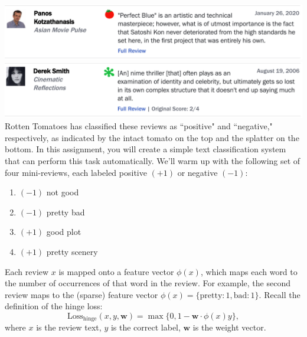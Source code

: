 \documentclass{article}
\theoremstyle{case}
\theoremstyle{definition}
\begin{document}
\includegraphics[width=\textwidth]{images/posreview.png}
\includegraphics[width=\textwidth]{images/negreview.png}
Rotten Tomatoes has classified these reviews as ``positive" and ``negative,"
     respectively, as indicated by the intact tomato on the top  and the
     splatter on the bottom. In this assignment, you will create a simple
     text classification system that can perform this task automatically. We'll warm up with the following set of four mini-reviews, each labeled
     positive $(+1)$ or negative $(-1)$:
\begin{enumerate}
    \item $(-1)$ not good
    \item $(-1)$ pretty bad
    \item $(+1)$ good plot
    \item $(+1)$ pretty scenery
\end{enumerate}
     Each review $x$ is mapped onto a feature vector $\phi(x)$, which maps each
     word to the number of occurrences of that word in the review. For example,
     the second review maps to the (sparse) feature vector $\phi(x) =
     \{\text{pretty}:1, \text{bad}:1\}$. Recall the definition of the hinge loss:
     $$\text{Loss}_{\text{hinge}}(x, y, \mathbf{w}) = \max \{0, 1 - \mathbf{w}
     \cdot \phi(x) y\},$$ where $x$ is the review text, $y$ is the correct label,
     $\mathbf{w}$ is the weight vector.
\end{document}

